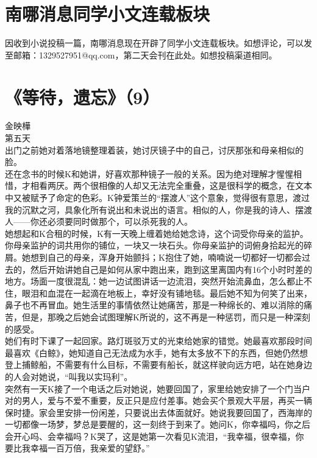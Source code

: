 \documentclass[letterpaper, 12pt]{article}
\begin{document}
\begin{multicols}{2}
\section{南哪消息同学小文连载板块}
因收到小说投稿一篇，南哪消息现在开辟了同学小文连载板块。如想评论，可以发至邮箱：1329527951@qq.com，第二天会刊在此处。如想投稿渠道相同。
\section{《等待，遗忘》（9）}
金映樺\\
\newCJKfontfamily{}\fan
第五天\\

出门之前她对着落地镜整理着装，她讨厌镜子中的自己，讨厌那张和母亲相似的脸。\\

还在念书的时候K和她讲，好喜欢那种镜子一般的关系。因为绝对理解才惺惺相惜，才相看两厌。两个很相像的人却又无法完全重叠，这是很科学的概念，在文本中又被赋予了命定的色彩。K钟爱策兰的“摆渡人”这个意象，觉得很有意思，渡过我的沉默之河，具象化所有说出和未说出的语言。相似的人，你是我的诗人、摆渡人——你还必须要同时做那个，可以杀死我的人。\\

她想起和K合租的时候，K有一天晚上缠着她给她念诗，这个词受你母亲的监护。你母亲监护的词共用你的铺位，一块又一块石头。你母亲监护的词俯身拾起光的碎屑。她想到自己的母亲，浑身开始颤抖；K抱住了她，喃喃说一切都好一切都会过去的，然后开始讲她自己是如何从家中跑出来，跑到这里离国内有16个小时时差的地方。场面一度很混乱：她一边试图讲话一边流泪，突然开始流鼻血，怎么都止不住，眼泪和血混在一起滴在地板上，幸好没有铺地毯。最后她不知为何笑了出来，鼻子也不再冒血。她生活里的事情依然让她痛苦，那是一种绵长的、难以消除的痛苦，但是，那晚之后她会试图理解K所说的，这不再是一种惩罚，而只是一种深刻的感受。\\

她们有时下课了一起回家。路灯斑驳万丈的光束给她家的错觉。她最喜欢那段时间最喜欢《白鲸》，她知道自己无法成为水手，她有太多放不下的东西，但她仍然想登上捕鲸船，不需要有什么目标，不需要有船长，就这样驶向远方吧，站在她身边的人会对她说，“叫我以实玛利”。\\

突然有一天K接了一个电话之后对她说，她要回国了，家里给她安排了一个门当户对的男人，爱与不爱不重要，反正只是应付差事。她会买个景观大平层，再买一辆保时捷。家会里安排一份闲差，只要说出去体面就好。她说我要回国了，西海岸的一切都像一场梦，梦总是要醒的，这一刻终于到来了。她问K，你幸福吗，你之后会开心吗、会幸福吗？K哭了，这是她第一次看见K流泪，“我幸福，很幸福，你要比我幸福一百万倍，我亲爱的望舒。”\\


\end{multicols}
\end{document}
